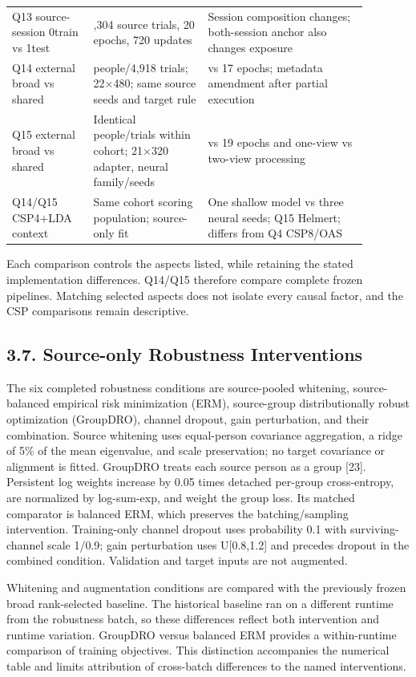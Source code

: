 \documentclass[11pt]{article}
\begin{document}
\begin{longtable}{@{}>{\raggedright\arraybackslash}p{0.197015\linewidth}>{\raggedright\arraybackslash}p{0.288955\linewidth}>{\raggedright\arraybackslash}p{0.394030\linewidth}@{}}
Q13 source-session 0train vs 1test & 2,304 source trials, 20 epochs, 720 updates & Session composition changes; both-session anchor also changes exposure \\
Q14 external broad vs shared & 109 people/4,918 trials; 22$\times$480; same source seeds and target rule & 18 vs 17 epochs; metadata amendment after partial execution \\
Q15 external broad vs shared & Identical people/trials within cohort; 21$\times$320 adapter, neural family/seeds & 14 vs 19 epochs and one-view vs two-view processing \\
Q14/Q15 CSP4+LDA context & Same cohort scoring population; source-only fit & One shallow model vs three neural seeds; Q15 Helmert; differs from Q4 CSP8/OAS \\
\end{longtable}
\noindent\footnotesize Each comparison controls the aspects listed, while retaining the stated implementation differences. Q14/Q15 therefore compare complete frozen pipelines. Matching selected aspects does not isolate every causal factor, and the CSP comparisons remain descriptive.
\par\endgroup\medskip
\subsection*{3.7. Source-only Robustness Interventions}
The six completed robustness conditions are source-pooled whitening, source-balanced empirical risk minimization (ERM), source-group distributionally robust optimization (GroupDRO), channel dropout, gain perturbation, and their combination. Source whitening uses equal-person covariance aggregation, a ridge of 5\% of the mean eigenvalue, and scale preservation; no target covariance or alignment is fitted. GroupDRO treats each source person as a group [23]. Persistent log weights increase by 0.05 times detached per-group cross-entropy, are normalized by log-sum-exp, and weight the group loss. Its matched comparator is balanced ERM, which preserves the batching/sampling intervention. Training-only channel dropout uses probability 0.1 with surviving-channel scale 1/0.9; gain perturbation uses U[0.8,1.2] and precedes dropout in the combined condition. Validation and target inputs are not augmented.

Whitening and augmentation conditions are compared with the previously frozen broad rank-selected baseline. The historical baseline ran on a different runtime from the robustness batch, so these differences reflect both intervention and runtime variation. GroupDRO versus balanced ERM provides a within-runtime comparison of training objectives. This distinction accompanies the numerical table and limits attribution of cross-batch differences to the named interventions.
\end{document}
